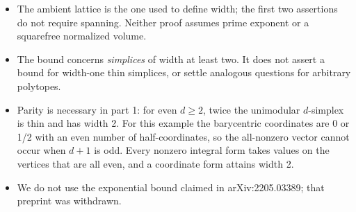 \documentclass[11pt]{article}
\newcommand{\tightlist}{\setlength{\itemsep}{2pt}\setlength{\parskip}{0pt}}
\begin{document}
\begin{itemize}
\tightlist
\item
  The ambient lattice is the one used to define width; the first two assertions do not require spanning. Neither proof assumes prime exponent or a squarefree normalized volume.
\item
  The bound concerns \emph{simplices} of width at least two. It does not assert a bound for width-one thin simplices, or settle analogous questions for arbitrary polytopes.
\item
  Parity is necessary in part 1: for even \(d\ge2\), twice the unimodular \(d\)-simplex is thin and has width 2. For this example the barycentric coordinates are 0 or 1/2 with an even number of half-coordinates, so the all-nonzero vector cannot occur when \(d+1\) is odd. Every nonzero integral form takes values on the vertices that are all even, and a coordinate form attains width 2.
\item
  We do not use the exponential bound claimed in arXiv:2205.03389; that preprint was withdrawn.
\end{itemize}
\end{document}
